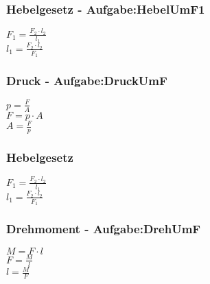 \subsubsection{Hebelgesetz - Aufgabe:HebelUmF1} 
\begin{minipage}{0.45\textwidth} 
$ F_{1}  = \frac{F_{2} \cdot l_{2} }{ l_{1} } $\\ 
$ l_{1}  = \frac{F_{2} \cdot l_{2} }{ F_{1} } $\\ 
\end{minipage} 
\begin{minipage}{0.45\textwidth} 
 
\end{minipage} 
\subsubsection{Druck - Aufgabe:DruckUmF} 
\begin{minipage}{0.45\textwidth} 
$ p = \frac{F}{A} $\\ 
$ F = p\cdot A $\\ 
$ A = \frac{F}{p} $\\ 
\end{minipage} 
\begin{minipage}{0.45\textwidth} 
 
\end{minipage} 
\subsubsection{Hebelgesetz} 
\begin{minipage}{0.45\textwidth} 
$ F_{1}  = \frac{F_{2} \cdot l_{2} }{ l_{1} } $\\ 
$ l_{1}  = \frac{F_{2} \cdot l_{2} }{ F_{1} } $\\ 
\end{minipage} 
\begin{minipage}{0.45\textwidth} 
 
\end{minipage} 
\subsubsection{Drehmoment - Aufgabe:DrehUmF} 
\begin{minipage}{0.45\textwidth} 
$ M = F\cdot l $\\ 
$ F = \frac{M}{l} $\\ 
$ l = \frac{M}{F} $\\ 
\end{minipage} 
\begin{minipage}{0.45\textwidth} 
 
\end{minipage} 
